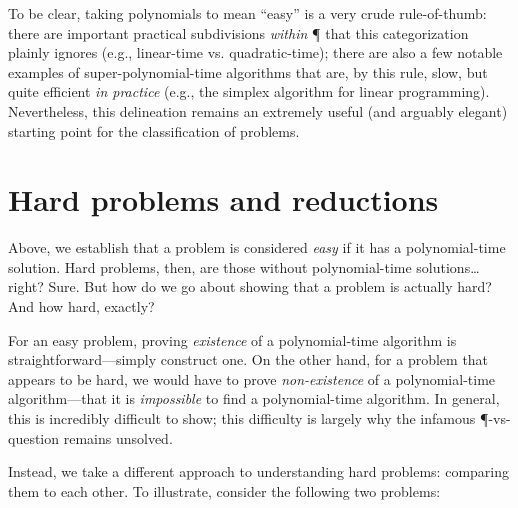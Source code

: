To be clear, taking polynomials to mean ``easy'' is a very crude rule-of-thumb:
there are important practical subdivisions \emph{within} \P{} that this
categorization plainly ignores (e.g., linear-time vs. quadratic-time); there are
also a few notable examples of super-polynomial-time algorithms that are, by
this rule, slow, but quite efficient \emph{in practice} (e.g., the simplex
algorithm for linear programming).  Nevertheless, this delineation remains an
extremely useful (and arguably elegant) starting point for the classification of
problems.

%
%
%

\section{Hard problems and reductions}

Above, we establish that a problem is considered \emph{easy} if it has a
polynomial-time solution.  Hard problems, then, are those without
polynomial-time solutions… right?  Sure.  But how do we go about showing that a
problem is actually hard?  And how hard, exactly?

For an easy problem, proving \emph{existence} of a polynomial-time algorithm is
straightforward---simply construct one.  On the other hand, for a problem that
appears to be hard, we would have to prove \emph{non-existence} of a
polynomial-time algorithm---that it is \emph{impossible} to find a
polynomial-time algorithm. In general, this is incredibly difficult to show;
this difficulty is largely why the infamous \P-vs-\NP{} question remains
unsolved.

Instead, we take a different approach to understanding hard problems: comparing
them to each other.  To illustrate, consider the following two problems:

